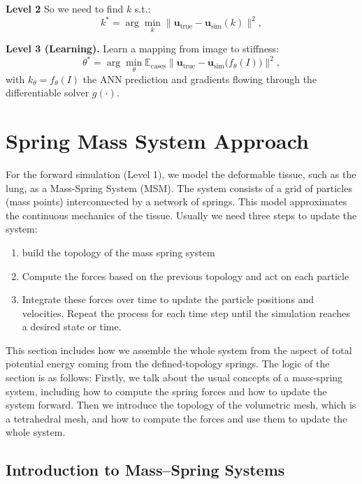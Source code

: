 \documentclass{article}
\begin{document}
\textbf{Level 2}
So we need to find \(k\) s.t.:
\[
  k^* = \arg\min_k
    \bigl\lVert \mathbf{u}_{\mathrm{true}}
    - \mathbf{u}_{\mathrm{sim}}(k)\bigr\rVert^2
,
\]




\textbf{Level 3 (Learning).}
Learn a mapping from image to stiffness:
\[
  \theta^* = \arg\min_\theta
    \mathbb{E}_{\mathrm{cases}}
    \bigl\lVert \mathbf{u}_{\mathrm{true}}
    - \mathbf{u}_{\mathrm{sim}}\bigl(f_\theta(I)\bigr)\bigr\rVert^2,
\]
with \(k_\theta = f_\theta(I)\) the ANN prediction and gradients flowing through the differentiable solver \(g(\cdot)\).






\section{Spring Mass System Approach}

For the forward simulation (Level 1), we model the deformable tissue, such as the lung, as a Mass-Spring System (MSM). 
The system consists of a grid of particles (mass points) interconnected by a network of springs. 
This model approximates the continuous mechanics of the tissue. Usually we need three steps to update the system:
\begin{enumerate}
  \item build the topology of the mass spring system
  \item Compute the forces based on the previous topology and act on each particle
  \item Integrate these forces over time to update the particle positions and velocities. Repeat the process for each time step until the simulation reaches a desired state or time.
\end{enumerate}
This section includes how we assemble the 
whole system from the aspect of total potential energy coming from the defined-topology springs.
The logic of the section is as follows: Firstly, we talk about the usual concepts of a mass-spring system, including
how to compute the spring forces and how to update the system forward. 
Then we introduce the topology of the volumetric mesh, which is a tetrahedral mesh, 
and how to compute the forces and use them to update the whole system.



\subsection{Introduction to Mass–Spring Systems}
\end{document}
